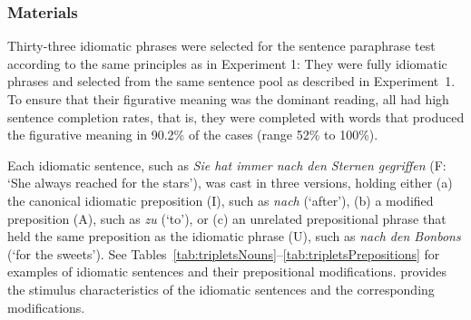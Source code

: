 \documentclass[output=paper]{langsci/langscibook}
\begin{document}
\subsubsection{Materials}
Thirty-three idiomatic phrases were selected for the sentence paraphrase test according to the same principles as in Experiment 1: They were fully idiomatic phrases and selected from the same sentence pool as described in Experiment~1.  To ensure that their figurative meaning was the dominant reading, all had high sentence completion rates, that is, they were completed with words that produced the figurative meaning in 90.2\% of the cases (range 52\% to 100\%).

Each idiomatic sentence, such as \textit{Sie hat immer nach den Sternen gegriffen} (F: `She always reached for the stars'), was cast in three versions, holding either (a) the canonical idiomatic preposition (I), such as \textit{nach} (‘after’), (b) a modified preposition (A), such as \textit{zu} (‘to’), or (c) an unrelated prepositional phrase that held the same preposition as the idiomatic phrase (U), such as \textit{nach den Bonbons} (‘for the sweets’). See Tables~\ref{tab:tripletsNouns}--\ref{tab:tripletsPrepositions} for examples of idiomatic sentences and their prepositional modifications.  provides the stimulus characteristics of the idiomatic sentences and the corresponding modifications.

\begin{table}
\caption{Idiomatic sentences and stimulus characteristics of the idiomatic and modified preposition, and unrelated prepositional phrase in Experiment 3. \textit{Notes:} N = number of items, Lemma = mean lemma frequency per one million, taken from CELEX \citep{baayen:1993}, Closure = mean sentence completion in \%.\label{tab:Table6}}
\end{table}
\end{document}
